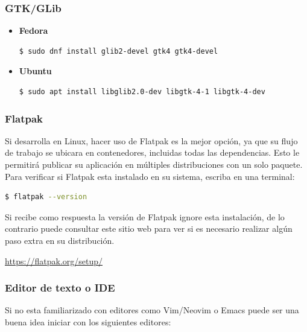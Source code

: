 \subsubsection{GTK/GLib}

\begin{itemize}
    \item \textbf{Fedora}
\begin{lstlisting}[language=bash]
$ sudo dnf install glib2-devel gtk4 gtk4-devel
\end{lstlisting}

    \item \textbf{Ubuntu}
\begin{lstlisting}[language=bash]
$ sudo apt install libglib2.0-dev libgtk-4-1 libgtk-4-dev
\end{lstlisting}
\end{itemize}


\subsubsection{Flatpak}

Si desarrolla en Linux, hacer uso de Flatpak es la mejor opción, ya que su flujo de trabajo se ubicara en contenedores, incluidas todas las dependencias. Esto le permitirá publicar su aplicación en múltiples distribuciones con un solo paquete. Para verificar si Flatpak esta instalado en su sistema, escriba en una terminal:

\begin{lstlisting}[language=bash]
$ flatpak --version
\end{lstlisting}

Si recibe como respuesta la versión de Flatpak ignore esta instalación, de lo contrario puede consultar este sitio web para ver si es necesario realizar algún paso extra en su distribución.

\url{https://flatpak.org/setup/}


\subsubsection{Editor de texto o IDE}

Si no esta familiarizado con editores como Vim/Neovim o Emacs puede ser una buena idea iniciar con los siguientes editores:

